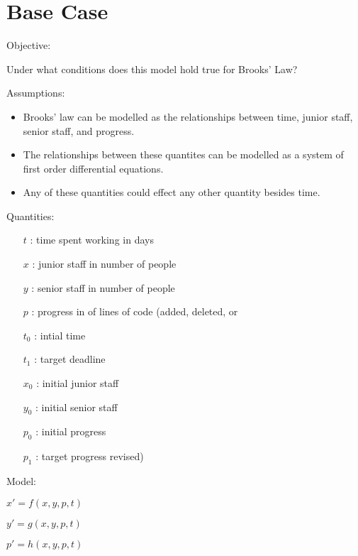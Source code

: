 \documentclass{article}
\newenvironment{atomize}
    {\begin{list} {} {
            \setlength\itemindent{0pt}
            \setlength\leftmargin{10pt}
            \setlength\labelwidth{0pt}
    }}
    {\end{list}}
\begin{document}
\section*{Base Case}
    \begin{atomize}
				\item Objective:

						Under what conditions does this model hold true for Brooks' Law?
        \item Assumptions:
            \begin{itemize}
								\item Brooks' law can be modelled as the relationships between
								time, junior staff, senior staff, and progress.
								\item The relationships between these quantites can be modelled
								as a system of first order differential equations.
								\item Any of these quantities could effect any other quantity
								besides time.  
								\end{itemize}
        \item Quantities:
            \begin{itemize}
                \item [$t$]: time spent working in days
                \item [$x$]: junior staff in number of people
                \item [$y$]: senior staff in number of people
                \item [$p$]: progress in of lines of code (added, deleted, or
								\item [$t_{0}$]: intial time
								\item [$t_{1}$]: target deadline
								\item [$x_{0}$]: initial junior staff
								\item [$y_{0}$]: initial senior staff
								\item [$p_{0}$]: initial progress
								\item [$p_{1}$]: target progress
								revised)
            \end{itemize}
        \item Model:
            \begin{atomize}
                \item $x\prime = f\left(x, y, p, t\right)$
                \item $y\prime = g\left(x, y, p, t\right)$
                \item $p\prime = h\left(x, y, p, t\right)$
            \end{atomize}
    \end{atomize}
\end{document}
